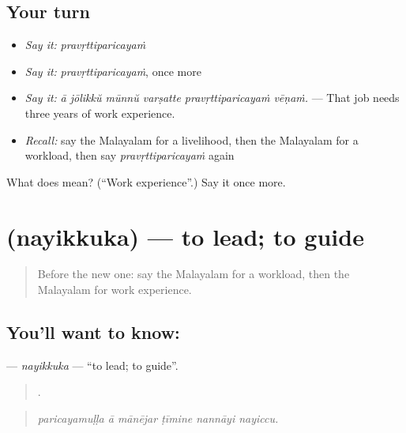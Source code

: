 \subsection*{Your turn}
\begin{itemize}
\raggedright
  \item \emph{Say it:} \emph{pravṛttiparicayaṁ}
  \item \emph{Say it:} \emph{pravṛttiparicayaṁ}, once more
  \item \emph{Say it:} \emph{ā jōlikkŭ mūnnŭ varṣatte pravṛttiparicayaṁ vēṇaṁ.} — That job needs three years of work experience.
  \item \emph{Recall:} say the Malayalam for a livelihood, then the Malayalam for a workload, then say \emph{pravṛttiparicayaṁ} again
\end{itemize}

\begin{tcolorbox}[breakable,colback=teal!4,colframe=teal!35!black,title={Before you move on}]
What does  mean? (\textquotedblleft{}Work experience\textquotedblright{}.) Say it once more.
\end{tcolorbox}
\section[\texorpdfstring{\ml{നയിക്കുക} (nayikkuka)}{നയിക്കുക (nayikkuka)}]{ (nayikkuka) — to lead; to guide}

\label{lesson:ML-C546-nayikkuka}



\begin{quote}
Before the new one: say the Malayalam for a workload, then the Malayalam for work experience.
\end{quote}

\subsection*{You'll want to know: }
\textbf{} — \emph{nayikkuka} — \textquotedblleft{}to lead; to guide\textquotedblright{}.

\begin{quote}
     .
\end{quote}

\begin{quote}
\emph{paricayamuḷḷa ā mānējar ṭīmine nannāyi nayiccu.}
\end{quote}

